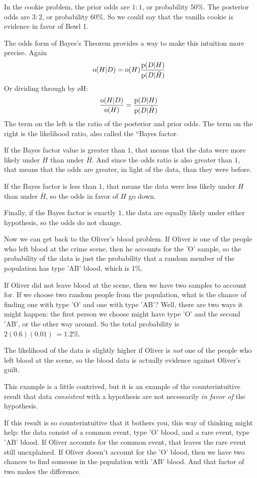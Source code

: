 \documentclass[12pt]{book}
\begin{document}
In the cookie problem, the prior odds are $1:1$, or probability 50\%.
The posterior odds are $3:2$, or probability 60\%.  So we could say
that the vanilla cookie is evidence in favor of Bowl 1.

The odds form of Bayes's Theorem provides a way to make this
intuition more precise.  Again
%
\[ \mathrm{o}(H|D) = \mathrm{o}(H) \frac{\mathrm{p}(D|H)}{\mathrm{p}(D|\bar{H})} \]
%
Or dividing through by \o{H}:
%
\[ \frac{\mathrm{o}(H|D)}{\mathrm{o}(H)} = \frac{\mathrm{p}(D|H)}{\mathrm{p}(D|\bar{H})} \]
%
The term on the left is the ratio of the posterior and prior odds.
The term on the right is the likelihood ratio, also called the ``Bayes
factor.

If the Bayes factor value is greater than $1$, that means that the
data were more likely under $H$ than under $\bar{H}$.  And since the
odds ratio is also greater than $1$, that means that the odds are
greater, in light of the data, than they were before.

If the Bayes factor is less than $1$, that means the data were
less likely under $H$ than under $\bar{H}$, so the odds in
favor of $H$ go down.

Finally, if the Bayes factor is exactly $1$, the data are equally
likely under either hypothesis, so the odds do not change.

Now we can get back to the Oliver's blood problem.  If Oliver is
one of the people who left blood at the crime scene, then he
accounts for the 'O' sample, so the probability of the data
is just the probability that a random member of the population
has type 'AB' blood, which is 1\%.

If Oliver did not leave blood at the scene, then we have two
samples to account for.  If we choose two random people from
the population, what is the chance of finding one with type 'O'
and one with type 'AB'?  Well, there are two ways it might happen:
the first person we choose might have type 'O' and the second
'AB', or the other way around.  So the total probability is
$2 (0.6) (0.01)\ = 1.2\%$.

The likelihood of the data is slightly higher if Oliver is
{\it not} one of the people who left blood at the scene, so
the blood data is actually evidence against Oliver's guilt.

This example is a little contrived, but it is an example of
the counterintuitive result that data {\it consistent} with
a hypothesis are not necessarily {\it in favor of}
the hypothesis.

If this result is so counterintuitive that it bothers you,
this way of thinking might help: the data consist of a common
event, type 'O' blood, and a rare event, type 'AB' blood.
If Oliver accounts for the common event, that leaves the rare
event still unexplained.  If Oliver doesn't account for the
'O' blood, then we have two chances to find someone in the
population with 'AB' blood.  And that factor of two makes
the difference.
\end{document}
